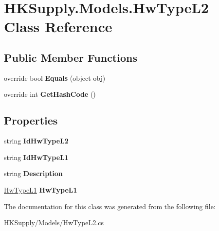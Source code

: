 \hypertarget{class_h_k_supply_1_1_models_1_1_hw_type_l2}{}\section{H\+K\+Supply.\+Models.\+Hw\+Type\+L2 Class Reference}
\label{class_h_k_supply_1_1_models_1_1_hw_type_l2}
\subsection*{Public Member Functions}
\begin{DoxyCompactItemize}
\item 
\mbox{\label{class_h_k_supply_1_1_models_1_1_hw_type_l2_a2f1231739eb055eadc2d6c5301a5a4ef}} 
override bool {\bfseries Equals} (object obj)
\item 
\mbox{\label{class_h_k_supply_1_1_models_1_1_hw_type_l2_aea1a5fe8b9ef844fbf3483dd96cc7c7c}} 
override int {\bfseries Get\+Hash\+Code} ()
\end{DoxyCompactItemize}
\subsection*{Properties}
\begin{DoxyCompactItemize}
\item 
\mbox{\label{class_h_k_supply_1_1_models_1_1_hw_type_l2_a19d4f1eaab63a183f6bd828def6da252}} 
string {\bfseries Id\+Hw\+Type\+L2}
\item 
\mbox{\label{class_h_k_supply_1_1_models_1_1_hw_type_l2_a64bb3b8cc3f40b16c8cc3eba79878555}} 
string {\bfseries Id\+Hw\+Type\+L1}
\item 
\mbox{\label{class_h_k_supply_1_1_models_1_1_hw_type_l2_a05e1083fefef6c92f58a2cb4257040a5}} 
string {\bfseries Description}
\item 
\mbox{\label{class_h_k_supply_1_1_models_1_1_hw_type_l2_a29f3ce14dcd01e47bd376639c7f5a8b8}} 
\mbox{\hyperlink{class_h_k_supply_1_1_models_1_1_hw_type_l1}{Hw\+Type\+L1}} {\bfseries Hw\+Type\+L1}
\end{DoxyCompactItemize}


The documentation for this class was generated from the following file\+:\begin{DoxyCompactItemize}
\item 
H\+K\+Supply/\+Models/Hw\+Type\+L2.\+cs\end{DoxyCompactItemize}
